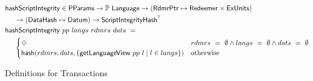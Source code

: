 \begin{figure*}[htb]
  \begin{align*}
  &\mathsf{hashScriptIntegrity} \in\mathsf{PParams} \to \mathbb{P}~\mathsf{Language} \to (\mathsf{RdmrPtr} \mapsto \mathsf{Redeemer} \times \mathsf{ExUnits}) \\
  &~~~~ \to (\mathsf{DataHash} \mapsto \mathsf{Datum}) \to \mathsf{ScriptIntegrityHash}^? \\
  &\mathsf{hashScriptIntegrity}~{pp}~{langs}~{rdmrs}~{dats}~=~ \\
                    &~~~~ \begin{cases}
                          \Diamond & rdmrs~=~\emptyset \land langs~=~\emptyset \land dats~=~\emptyset \\
                          \mathsf{hash} (rdmrs, dats, \{ \mathsf{getLanguageView}~pp~l \mid l \in langs \}) & \text{otherwise}
                        \end{cases}
  \end{align*}
  \caption{Definitions for Transactions}
  \label{fig:defs:utxo-sophie-1}
\end{figure*}


